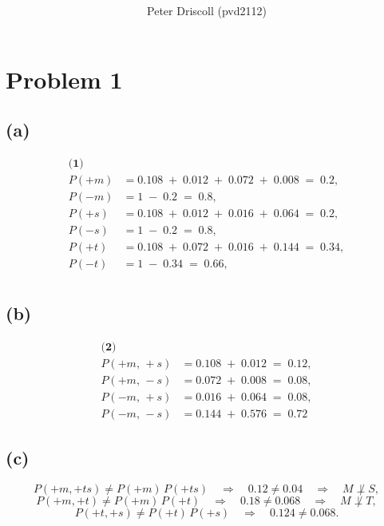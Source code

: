 \documentclass[11pt]{article}
\title{%
  \titlefont{COMS W4701: Artificial Intelligence, Spring 2025} \\
\subtitlefont{Homework \#4}} %
\author{Peter Driscoll (pvd2112)} %
\begin{document}
\maketitle

\section*{Problem 1}

\subsection*{(a)}
\[
\begin{aligned}
\textbf{(1)}& \\[6pt]
P(+m) &= 0.108 \;+\; 0.012 \;+\; 0.072 \;+\; 0.008 \;=\; 0.2,\\
P(-m) &= 1 \;-\; 0.2 \;=\; 0.8,\\[6pt]
P(+s) &= 0.108 \;+\; 0.012 \;+\; 0.016 \;+\; 0.064 \;=\; 0.2,\\
P(-s) &= 1 \;-\; 0.2 \;=\; 0.8,\\[6pt]
P(+t) &= 0.108 \;+\; 0.072 \;+\; 0.016 \;+\; 0.144 \;=\; 0.34,\\
P(-t) &= 1 \;-\; 0.34 \;=\; 0.66,\\[12pt]
\end{aligned}
\]

\subsection*{(b)}
\[
\begin{aligned}
\textbf{(2)}& \\[6pt]
P(+m,\, +s) &= 0.108 \;+\; 0.012 \;=\; 0.12,\\
P(+m,\, -s) &= 0.072 \;+\; 0.008 \;=\; 0.08,\\
P(-m,\, +s) &= 0.016 \;+\; 0.064 \;=\; 0.08,\\
P(-m,\, -s) &= 0.144 \;+\; 0.576 \;=\; 0.72\; 
\end{aligned}
\]

\subsection*{(c)}

\[
P(+m, +ts) \neq P(+m)\,P(+ts) \quad \Longrightarrow \quad 0.12 \neq 0.04 \quad \Longrightarrow \quad M \not\perp S,
\]
\[
P(+m, +t) \neq P(+m)\,P(+t) \quad \Longrightarrow \quad 0.18 \neq 0.068 \quad \Longrightarrow \quad M \not\perp T,
\]
\[
P(+t, +s) \neq P(+t)\,P(+s) \quad \Longrightarrow \quad 0.124 \neq 0.068.
\]
\end{document}
